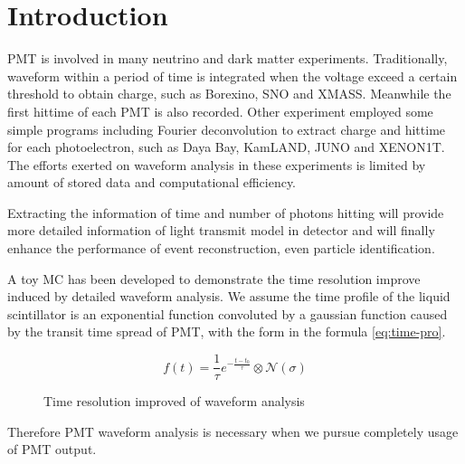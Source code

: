 \section{Introduction} %
\label{sec:Introduction}
PMT is involved in many neutrino and dark matter experiments. Traditionally, waveform within a period of time is integrated when the voltage exceed a certain threshold to obtain charge, such as Borexino\cite{lagomarsino_gateless_1999}, SNO\cite{dunger_event_2019} and XMASS\cite{abe_xmass_2013}. Meanwhile the first hittime of each PMT is also recorded. Other experiment employed some simple programs including Fourier deconvolution to extract charge and hittime for each photoelectron, such as Daya Bay\cite{huang_flash_2018}, KamLAND\cite{the_kamland_collaboration_production_2010}, JUNO\cite{zhang_comparison_2019} and XENON1T\cite{aprile_xenon1t_2019}. The efforts exerted on waveform analysis in these experiments is limited by amount of stored data and computational efficiency. 

Extracting the information of time and number of photons hitting will provide more detailed information of light transmit model in detector and will finally enhance the performance of event reconstruction, even particle identification. 

A toy MC has been developed to demonstrate the time resolution improve induced by detailed waveform analysis. We assume the time profile of the liquid scintillator is an exponential function convoluted by a gaussian function caused by the transit time spread of PMT\cite{li_separation_2016}, with the form in the formula \eqref{eq:time-pro}. 

\begin{equation}
    f(t) = \frac{1}{\tau}e^{-\frac{t - t_{0}}{\tau}} \otimes \mathcal{N}(\sigma)
    \label{eq:time-pro}
\end{equation}

\begin{minipage}{1.0\textwidth}
\begin{figure}[H]    
    \centering
    \scalebox{0.35}{}
    \caption{\label{fig:reso-diff} Time resolution improved of waveform analysis}
\end{figure}
\end{minipage}

Therefore PMT waveform analysis is necessary when we pursue completely usage of PMT output. 

